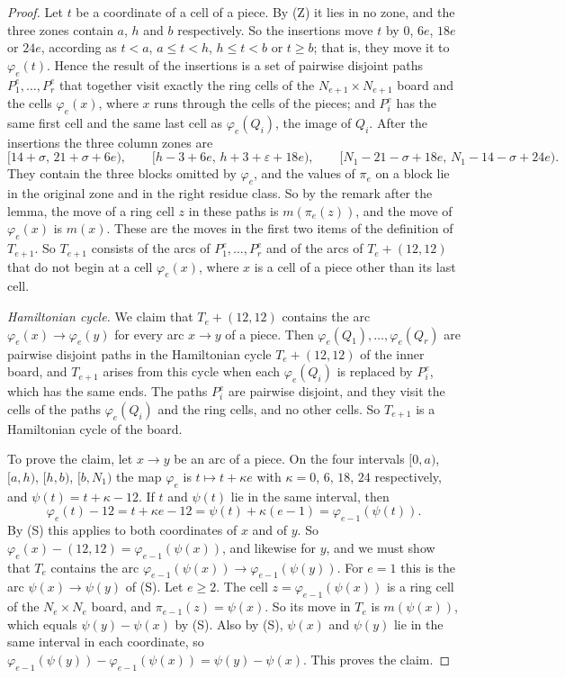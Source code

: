 \documentclass[11pt]{amsart}
\theoremstyle{remark}
\begin{document}
\begin{proof}
Let $t$ be a coordinate of a cell of a piece. By (Z) it lies in no zone, and the three zones contain $a$, $h$ and
$b$ respectively. So the insertions move $t$ by $0$, $6e$, $18e$ or $24e$, according as $t<a$, $a\le t<h$,
$h\le t<b$ or $t\ge b$; that is, they move it to $\varphi_e(t)$. Hence the result of the insertions is a set of
pairwise disjoint paths $P_1^e,\dots,P_r^e$ that together visit exactly the ring cells of the
$N_{e+1}\times N_{e+1}$ board and the cells $\varphi_e(x)$, where $x$ runs through the cells of the pieces; and
$P_i^e$ has the same first cell and the same last cell as $\varphi_e(Q_i)$, the image of $Q_i$. After the
insertions the three column zones are
\[ [14+\sigma,\,21+\sigma+6e),\qquad [h-3+6e,\,h+3+\varepsilon+18e),\qquad
[N_1-21-\sigma+18e,\,N_1-14-\sigma+24e). \]
They contain the three blocks omitted by $\varphi_e$, and the values of $\pi_e$ on a block lie in the original zone
and in the right residue class. So by the remark after the lemma, the move of a ring cell $z$ in these paths is
$m(\pi_e(z))$, and the move of $\varphi_e(x)$ is $m(x)$. These are the moves in the first two items of the
definition of $T_{e+1}$. So $T_{e+1}$ consists of the arcs of $P_1^e,\dots,P_r^e$ and of the arcs of $T_e+(12,12)$
that do not begin at a cell $\varphi_e(x)$, where $x$ is a cell of a piece other than its last cell.

\emph{Hamiltonian cycle.} We claim that $T_e+(12,12)$ contains the arc $\varphi_e(x)\to\varphi_e(y)$ for every arc
$x\to y$ of a piece. Then $\varphi_e(Q_1),\dots,\varphi_e(Q_r)$ are pairwise disjoint paths in the Hamiltonian cycle
$T_e+(12,12)$ of the inner board, and $T_{e+1}$ arises from this cycle when each $\varphi_e(Q_i)$ is replaced by
$P_i^e$, which has the same ends. The paths $P_i^e$ are pairwise disjoint, and they visit the cells of the paths
$\varphi_e(Q_i)$ and the ring cells, and no other cells. So $T_{e+1}$ is a Hamiltonian cycle of the board.

To prove the claim, let $x\to y$ be an arc of a piece. On the four intervals $[0,a)$, $[a,h)$, $[h,b)$, $[b,N_1)$
the map $\varphi_e$ is $t\mapsto t+\kappa e$ with $\kappa=0$, $6$, $18$, $24$ respectively, and
$\psi(t)=t+\kappa-12$. If $t$ and $\psi(t)$ lie in the same interval, then
\[ \varphi_e(t)-12=t+\kappa e-12=\psi(t)+\kappa(e-1)=\varphi_{e-1}(\psi(t)). \]
By (S) this applies to both coordinates of $x$ and of $y$. So
$\varphi_e(x)-(12,12)=\varphi_{e-1}(\psi(x))$, and likewise for $y$, and we must show that $T_e$ contains the arc
$\varphi_{e-1}(\psi(x))\to\varphi_{e-1}(\psi(y))$. For $e=1$ this is the arc $\psi(x)\to\psi(y)$ of (S). Let
$e\ge2$. The cell $z=\varphi_{e-1}(\psi(x))$ is a ring cell of the $N_e\times N_e$ board, and
$\pi_{e-1}(z)=\psi(x)$. So its move in $T_e$ is $m(\psi(x))$, which equals $\psi(y)-\psi(x)$ by (S). Also by (S),
$\psi(x)$ and $\psi(y)$ lie in the same interval in each coordinate, so
$\varphi_{e-1}(\psi(y))-\varphi_{e-1}(\psi(x))=\psi(y)-\psi(x)$. This proves the claim.


\end{proof}
\end{document}
